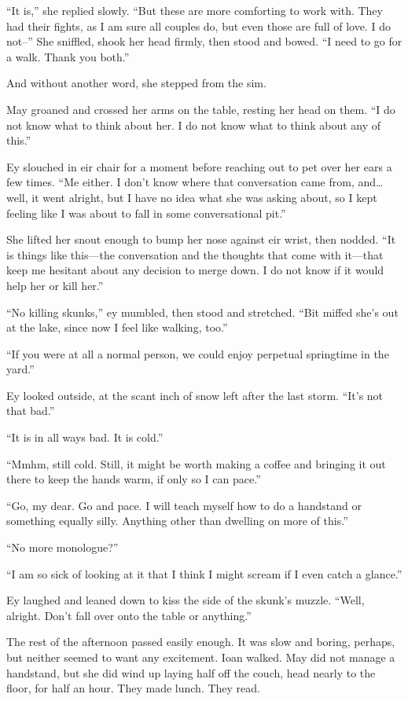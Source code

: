 ``It is,'' she replied slowly. ``But these are more comforting to work with. They had their fights, as I am sure all couples do, but even those are full of love. I do not--'' She sniffled, shook her head firmly, then stood and bowed. ``I need to go for a walk. Thank you both.''

And without another word, she stepped from the sim.

May groaned and crossed her arms on the table, resting her head on them. ``I do not know what to think about her. I do not know what to think about any of this.''

Ey slouched in eir chair for a moment before reaching out to pet over her ears a few times. ``Me either. I don't know where that conversation came from, and\ldots well, it went alright, but I have no idea what she was asking about, so I kept feeling like I was about to fall in some conversational pit.''

She lifted her snout enough to bump her nose against eir wrist, then nodded. ``It is things like this—the conversation and the thoughts that come with it—that keep me hesitant about any decision to merge down. I do not know if it would help her or kill her.''

``No killing skunks,'' ey mumbled, then stood and stretched. ``Bit miffed she's out at the lake, since now I feel like walking, too.''

``If you were at all a normal person, we could enjoy perpetual springtime in the yard.''

Ey looked outside, at the scant inch of snow left after the last storm. ``It's not that bad.''

``It is in all ways bad. It is cold.''

``Mmhm, still cold. Still, it might be worth making a coffee and bringing it out there to keep the hands warm, if only so I can pace.''

``Go, my dear. Go and pace. I will teach myself how to do a handstand or something equally silly. Anything other than dwelling on more of this.''

``No more monologue?''

``I am so sick of looking at it that I think I might scream if I even catch a glance.''

Ey laughed and leaned down to kiss the side of the skunk's muzzle. ``Well, alright. Don't fall over onto the table or anything.''

The rest of the afternoon passed easily enough. It was slow and boring, perhaps, but neither seemed to want any excitement. Ioan walked. May did not manage a handstand, but she did wind up laying half off the couch, head nearly to the floor, for half an hour. They made lunch. They read.

